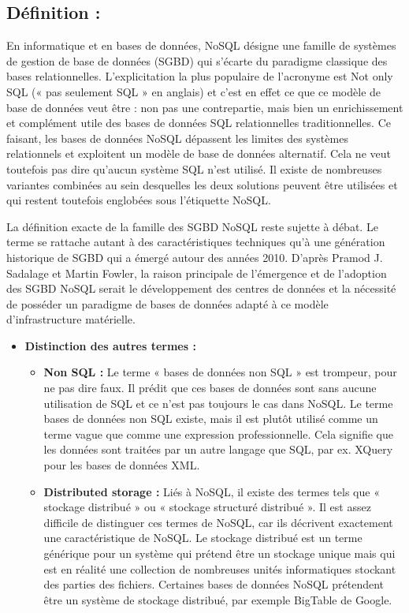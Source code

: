 \subsection{Définition : }
En informatique et en bases de données, NoSQL désigne une famille de systèmes de gestion de base de données (SGBD) qui s'écarte du paradigme classique des bases relationnelles. L'explicitation la plus populaire de l'acronyme est Not only SQL (« pas seulement SQL » en anglais) et c'est en effet ce que ce modèle de base
de données veut être : non pas une contrepartie, mais bien un enrichissement et complément utile des bases de données SQL relationnelles traditionnelles. Ce faisant, les bases de données NoSQL dépassent les limites des systèmes relationnels et exploitent un modèle de base de données alternatif. Cela ne veut toutefois pas dire qu'aucun système SQL n'est utilisé. Il existe de nombreuses variantes combinées au sein desquelles les deux solutions peuvent être utilisées et qui restent toutefois englobées sous l'étiquette NoSQL.

La définition exacte de la famille des SGBD NoSQL reste sujette à débat. Le terme se rattache autant à des caractéristiques techniques qu'à une génération historique de SGBD qui a émergé autour des années 2010. D'après Pramod J. Sadalage et Martin Fowler, la raison principale de l'émergence et de l'adoption des SGBD NoSQL serait le développement des centres de données et la nécessité de posséder un paradigme de bases de données adapté à ce modèle d'infrastructure matérielle.
\begin{itemize}[label=\textbullet]
\item \textbf{Distinction des autres termes :}
\begin{itemize}[label=\textbullet]
\item \textbf{Non SQL :} Le terme « bases de données non SQL » est trompeur, pour ne pas dire faux. Il prédit que ces bases de données sont sans aucune utilisation de SQL et ce n'est pas toujours le cas dans NoSQL. Le terme bases de données non SQL existe, mais il est plutôt utilisé comme un terme vague que comme une expression professionnelle. Cela signifie que les données sont traitées par un autre langage que SQL, par ex. XQuery pour les bases de données XML.
\item \textbf{Distributed storage :} Liés à NoSQL, il existe des termes tels que « stockage distribué » ou « stockage structuré distribué ». Il est assez difficile de distinguer ces termes de NoSQL, car ils décrivent exactement une caractéristique de NoSQL. Le stockage distribué est un terme générique pour un système qui prétend être un stockage unique mais qui est en réalité une collection de nombreuses unités informatiques stockant des parties des fichiers. Certaines bases de données NoSQL prétendent être un système de stockage distribué, par exemple BigTable de Google.
\end{itemize}
\end{itemize}